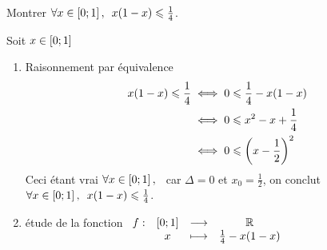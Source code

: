 \begin{exoex}
	Montrer \(\quantifs{\forall x \in \intervii{0}{1}} x(1-x) \leq \frac{1}{4}\).
\end{exoex}

\begin{corr}[2 Méthode]
	Soit \(x \in \left[0;1\right] \)
	\begin{enumerate}
		\item Raisonnement par équivalence
		      \[\begin{align}
				      x(1-x) \leqslant \frac{1}{4} & \iff 0 \leqslant \frac{1}{4}-x(1-x)     \\
				                              & \iff 0\leqslant x^2 -x +  \frac{1}{4}   \\
				                              & \iff 0\leqslant\left(x- \frac{1}{2}\right)^2
			      \end{align}
		      \]
		      Ceci étant vrai \(\quantifs{\forall x\in \intervii{0}{1}}\) car \(\Delta = 0\) et \(x_0 =  \frac{1}{2}\), on conclut \(\quantifs{\forall x \in \intervii{0}{1}} x(1-x) \leq \frac{1}{4}\).\\
		\item étude de la fonction \(\begin{array}[t]{cccc}f : & \left[0;1\right] & \longrightarrow & \mathbb{R} \\ & x & \longmapsto & \frac{1}{4}-x(1-x)\end{array}\)\\
	\end{enumerate}
\end{corr}


